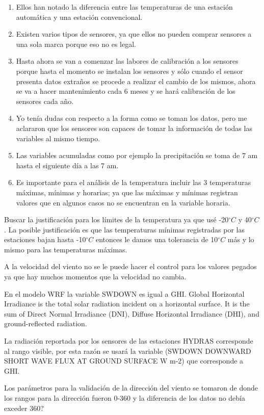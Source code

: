 \documentclass[11pt]{article}
\def\celc{$^{\circ}C$ }%
\begin{document}
\begin{enumerate}
\item Ellos han notado la diferencia entre las temperaturas de una estación automática y una estación convencional.
\item Existen varios tipos de sensores, ya que ellos no pueden comprar sensores a una sola marca porque eso no es legal.
\item Hasta ahora se van a comenzar las labores de calibración a los sensores porque hasta el momento se instalan los sensores y sólo cuando el sensor presenta datos extraños se procede a realizar el cambio de los mismos, ahora se va a hacer mantenimiento cada 6 meses y se hará calibración de los sensores cada año.
\item Yo tenía dudas con respecto a la forma como se toman los datos, pero me aclararon que los sensores son capaces de tomar la información de todas las variables al mismo tiempo.
\item Las variables acumuladas como por ejemplo la precipitación se toma de 7 am hasta el siguiente día a las 7 am.
\item Es importante para el análisis de la temperatura incluir las 3 temperaturas máximas, mínimas y horarias; ya que las máximas y mínimas registran valores que en algunos casos no se encuentran en la variable horaria.

\end{enumerate}

Buscar la justificación para los límites de la temperatura ya que usé -20\celc y 40\celc. La posible justificación es que las temperaturas mínimas registradas por las estaciones bajan hasta -10\celc entonces le damos una tolerancia de 10\celc más y lo mismo para las temperaturas máximas.

A la velocidad del viento no se le puede hacer el control para los valores pegados ya que hay muchos momentos que la velocidad no cambia.

En el modelo WRF la variable SWDOWN es igual a GHI. Global Horizontal Irradiance is the total solar radiation incident on a horizontal surface. It is the sum of Direct Normal Irradiance (DNI), Diffuse Horizontal Irradiance (DHI), and ground-reflected radiation.

La radiación reportada por los sensores de las estaciones HYDRAS corresponde al rango visible, por esta razón se usará la variable (SWDOWN DOWNWARD SHORT WAVE FLUX AT GROUND SURFACE W m-2) que corresponde a GHI.

Los parámetros para la validación de la dirección del viento se tomaron de \citep{Shafer2000a, DeGaetano1996} donde los rangos para la dirección fueron 0-360 y la diferencia de los datos no debía exceder 360?
\end{document}
